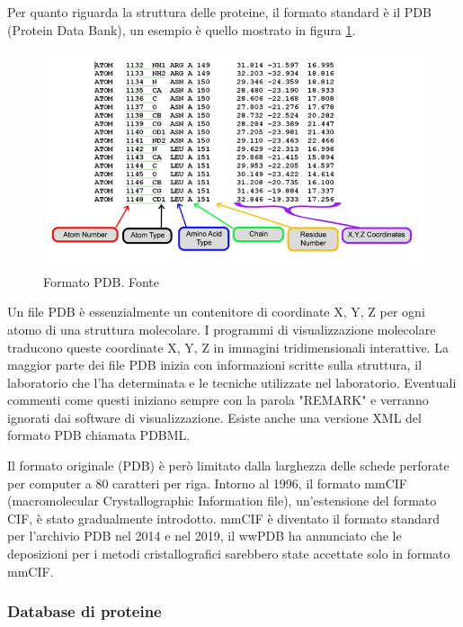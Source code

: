 \par Per quanto riguarda la struttura delle proteine, il formato standard è il PDB (Protein Data Bank), un esempio è quello mostrato in figura \ref{fig:pdb-format}.

\begin{figure}[!htb]
	\centering
	\includegraphics[scale=0.65]{images/pdbFile.jpg}
	\caption{Formato PDB. Fonte\cite{pdbFormat}}
	\label{fig:pdb-format}
\end{figure}

Un file PDB è essenzialmente un contenitore di coordinate X, Y, Z per ogni atomo di una struttura molecolare. I programmi di visualizzazione molecolare traducono queste coordinate X, Y, Z in immagini tridimensionali interattive. La maggior parte dei file PDB inizia con informazioni scritte sulla struttura, il laboratorio che l'ha determinata e le tecniche utilizzate nel laboratorio. Eventuali commenti come questi iniziano sempre con la parola "REMARK" e verranno ignorati dai software di visualizzazione. Esiste anche una versione XML del formato PDB chiamata PDBML.

\par Il formato originale (PDB) è però limitato dalla larghezza delle schede perforate per computer a 80 caratteri per riga. Intorno al 1996, il formato mmCIF (macromolecular Crystallographic Information file), un'estensione del formato CIF, è stato gradualmente introdotto. mmCIF è diventato il formato standard per l'archivio PDB nel 2014 e nel 2019, il wwPDB ha annunciato che le deposizioni per i metodi cristallografici sarebbero state accettate solo in formato mmCIF.

\subsubsection{Database di proteine}

